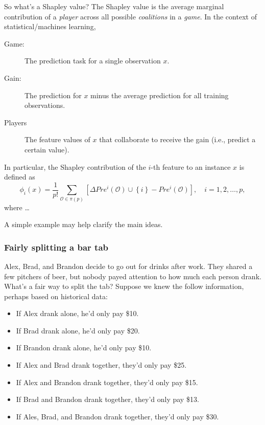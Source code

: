 So what's a Shapley value? The Shapley value is the average marginal
contribution of a \emph{player} across all possible \emph{coalitions} in
a \emph{game}. In the context of statistical/machines learning,

\begin{description}

  \item[Game:] The prediction task for a single observation $x$.
  
  \item[Gain:] The prediction for $x$ minus the average prediction for all training observations.
  
  \item[Players] The feature values of $x$ that collaborate to receive the gain (i.e., predict a certain value).
  
\end{description}

In particular, the Shapley contribution of the \(i\)-th feature to an
instance \(x\) is defined as \begin{equation}
\nonumber
\phi_i\left(x\right) = \frac{1}{p!} \sum_{\mathcal{O} \in \pi\left(p\right)} \left[\Delta Pre^i\left(\mathcal{O}\right) \cup \left\{i\right\} - Pre^i\left(\mathcal{O}\right)\right], \quad i = 1, 2, \dots, p,
\end{equation} where \ldots{}

A simple example may help clarify the main ideas.

\hypertarget{fairly-splitting-a-bar-tab}{%
\subsubsection{Fairly splitting a bar
tab}\label{fairly-splitting-a-bar-tab}}

Alex, Brad, and Brandon decide to go out for drinks after work. They
shared a few pitchers of beer, but nobody payed attention to how much
each person drank. What's a fair way to split the tab? Suppose we knew
the follow information, perhaps based on historical data:

\begin{itemize}

  \item If Alex drank alone, he'd only pay \$10.
  
  \item If Brad drank alone, he'd only pay \$20.
  
  \item If Brandon drank alone, he'd only pay \$10.
  
  \item If Alex and Brad drank together, they'd only pay \$25.
  
  \item If Alex and Brandon drank together, they'd only pay \$15.
  
  \item If Brad and Brandon drank together, they'd only pay \$13.
  
  \item If Ales, Brad, and Brandon drank together, they'd only pay \$30.

\end{itemize}

